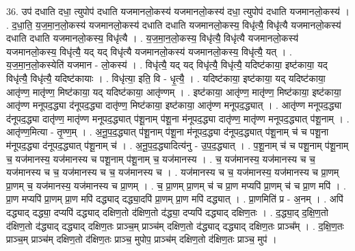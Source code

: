 \documentclass[17pt]{extarticle}
\begin{document}
36. उप॑ दधाति दधा॒ त्युपोप॑ दधाति यजमानलो॒कस्य॑ यजमानलो॒कस्य॑ दधा॒ त्युपोप॑ दधाति यजमानलो॒कस्य॑ । . द॒धा॒ति॒ य॒ज॒मा॒न॒लो॒कस्य॑ यजमानलो॒कस्य॑ दधाति दधाति यजमानलो॒कस्य॒ विधृ॑त्यै॒ विधृ॑त्यै यजमानलो॒कस्य॑ दधाति दधाति यजमानलो॒कस्य॒ विधृ॑त्यै । . य॒ज॒मा॒न॒लो॒कस्य॒ विधृ॑त्यै॒ विधृ॑त्यै यजमानलो॒कस्य॑ यजमानलो॒कस्य॒ विधृ॑त्यै॒ यद् यद् विधृ॑त्यै यजमानलो॒कस्य॑ यजमानलो॒कस्य॒ विधृ॑त्यै॒ यत् । . य॒ज॒मा॒न॒लो॒कस्येति॑ यजमान - लो॒कस्य॑ । . विधृ॑त्यै॒ यद् यद् विधृ॑त्यै॒ विधृ॑त्यै॒ यदिष्ट॑काया॒ इष्ट॑काया॒ यद् विधृ॑त्यै॒ विधृ॑त्यै॒ यदिष्ट॑कायाः । . विधृ॑त्या॒ इति॒ वि - धृ॒त्यै॒ । . यदिष्ट॑काया॒ इष्ट॑काया॒ यद् यदिष्ट॑काया॒ आतृ॑ण्ण॒ मातृ॑ण्ण॒ मिष्ट॑काया॒ यद् यदिष्ट॑काया॒ आतृ॑ण्णम् । . इष्ट॑काया॒ आतृ॑ण्ण॒ मातृ॑ण्ण॒ मिष्ट॑काया॒ इष्ट॑काया॒ आतृ॑ण्ण मनूपद॒द्ध्या द॑नूपद॒द्ध्या दातृ॑ण्ण॒ मिष्ट॑काया॒ इष्ट॑काया॒ आतृ॑ण्ण मनूपद॒द्ध्यात् । . आतृ॑ण्ण मनूपद॒द्ध्या द॑नूपद॒द्ध्या दातृ॑ण्ण॒ मातृ॑ण्ण मनूपद॒द्ध्यात् प॑शू॒नाम् प॑शू॒ना म॑नूपद॒द्ध्या दातृ॑ण्ण॒ मातृ॑ण्ण मनूपद॒द्ध्यात् प॑शू॒नाम् । . आतृ॑ण्ण॒मित्या - तृ॒ण्ण॒म् । . अ॒नू॒प॒द॒द्ध्यात् प॑शू॒नाम् प॑शू॒ना म॑नूपद॒द्ध्या द॑नूपद॒द्ध्यात् प॑शू॒नाम् च॑ च पशू॒ना म॑नूपद॒द्ध्या द॑नूपद॒द्ध्यात् प॑शू॒नाम् च॑ । . अ॒नू॒प॒द॒द्ध्यादित्य॑नु - उ॒प॒द॒द्ध्यात् । . प॒शू॒नाम् च॑ च पशू॒नाम् प॑शू॒नाम् च॒ यज॑मानस्य॒ यज॑मानस्य च पशू॒नाम् प॑शू॒नाम् च॒ यज॑मानस्य । . च॒ यज॑मानस्य॒ यज॑मानस्य च च॒ यज॑मानस्य च च॒ यज॑मानस्य च च॒ यज॑मानस्य च । . यज॑मानस्य च च॒ यज॑मानस्य॒ यज॑मानस्य च प्रा॒णम् प्रा॒णम् च॒ यज॑मानस्य॒ यज॑मानस्य च प्रा॒णम् । . च॒ प्रा॒णम् प्रा॒णम् च॑ च प्रा॒ण मप्यपि॑ प्रा॒णम् च॑ च प्रा॒ण मपि॑ । . प्रा॒ण मप्यपि॑ प्रा॒णम् प्रा॒ण मपि॑ दद्ध्याद् दद्ध्या॒दपि॑ प्रा॒णम् प्रा॒ण मपि॑ दद्ध्यात् । . प्रा॒णमिति॑ प्र - अ॒नम् । . अपि॑ दद्ध्याद् दद्ध्या॒ दप्यपि॑ दद्ध्याद् दक्षिण॒तो द॑क्षिण॒तो द॑द्ध्या॒ दप्यपि॑ दद्ध्याद् दक्षिण॒तः । . द॒द्ध्या॒द् द॒क्षि॒ण॒तो द॑क्षिण॒तो द॑द्ध्याद् दद्ध्याद् दक्षिण॒तः प्राञ्च॒म् प्राञ्च॑म् दक्षिण॒तो द॑द्ध्याद् दद्ध्याद् दक्षिण॒तः प्राञ्च᳚म् । . द॒क्षि॒ण॒तः प्राञ्च॒म् प्राञ्च॑म् दक्षिण॒तो द॑क्षिण॒तः प्राञ्च॒ मुपोप॒ प्राञ्च॑म् दक्षिण॒तो द॑क्षिण॒तः प्राञ्च॒ मुप॑ । \newline
\pagebreak
{}
\end{document}
